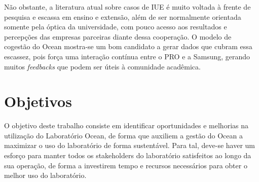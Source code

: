 Não obstante, a literatura atual sobre casos de IUE é muito voltada à frente de pesquisa e escassa em ensino e extensão, além de ser normalmente orientada somente pela óptica da universidade, com pouco acesso aos resultados e percepções das empresas parceiras diante dessa cooperação. O modelo de cogestão do Ocean mostra-se um bom candidato a gerar dados que cubram essa escassez, pois força uma interação contínua entre o PRO e a Samsung, gerando muitos \textit{feedbacks} que podem ser úteis à comunidade acadêmica. 

\section[Objetivos]{Objetivos}
\label{chap:objetivos}

O objetivo deste trabalho consiste em identificar oportunidades e melhorias na utilização do Laboratório Ocean, de forma que auxiliem a gestão do Ocean a maximizar o uso do laboratório de forma sustentável. Para tal, deve-se haver um esforço para manter todos os stakeholders do laboratório satisfeitos ao longo da sua operação, de forma a investirem tempo e recursos necessários para obter o melhor uso do laboratório.